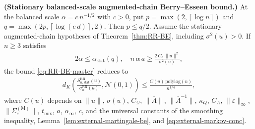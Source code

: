 \begin{corollary}\label{cor:RR-BE-working}
  \textbf{(Stationary balanced-scale augmented-chain Berry--Esseen bound.)}
  At the balanced scale \(\alpha = c \, n^{-1 / 2}\) with \(c > 0\), put
  \(p = \max(2, \left\lceil \log n \right\rceil)\) and \(q = \max(2 p, \left\lceil \log(e \, d) \right\rceil, 2)\).
  Then \(p \le q / 2\). Assume the stationary augmented-chain hypotheses of
  Theorem~\ref{thm:RR-BE}, including \(\sigma^2(u) > 0\). If \(n \ge 3\) satisfies
\begin{equation}
\begin{aligned}
  2 \alpha \le \alpha_{\text{stat}}(q),
  \quad
  n \, \alpha \, a \ge \frac{2 \, C_3 \, \lVert  u  \rVert^2}{\sigma^2(u)},
\end{aligned}
\end{equation}
  the bound
  \eqref{eq:RR-BE-master} reduces to
\begin{equation}
\begin{aligned}
  d_K \left(
    \frac{S_{n, \text{stat}}^{\text{RR}}(u)}{\sigma_n^{\text{RR}}(u)},
    \mathcal{N}(0, 1)
  \right)
    \le \frac{C(u) \, \text{polylog}(n)}{n^{1 / 4}},
\end{aligned}
\end{equation}
  where \(C(u)\) depends on \(\lVert  u  \rVert\), \(\sigma(u)\), \(C_{\mathcal{Q}}\),
  \(\lVert  \overline{A}  \rVert\), \(\lVert  \overline{A}^{-1}  \rVert\), \(\kappa_Q\), \(C_A\),
  \(\lVert  \varepsilon  \rVert_\infty\), \(\lVert  \Sigma_{\varepsilon}^{(\text{M})}  \rVert\),
  \(t_{\text{mix}}\), \(a\), \(\alpha_\infty\), \(c\), and the universal constants of
  the smoothing inequality, Lemma~\ref{lem:external-martingale-be}, and
  \eqref{eq:external-markov-conc}.
\end{corollary}


